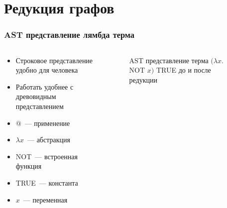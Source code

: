 \section{Редукция графов}

\begin{frame}
    \frametitle{AST представление лямбда терма}
    \begin{columns}
        \begin{column}{0.5\textwidth}
            \begin{itemize}
                \item Строковое представление удобно для человека
                \item Работать удобнее с древовидным представлением
                \item $@$~--- применение
                \item $\lambda x$~--- абстракция
                \item NOT~--- встроенная функция
                \item TRUE~--- константа
                \item $x$~--- переменная
            \end{itemize}
        \end{column}
        \begin{column}{0.5\textwidth}
            \begin{figure}
                \caption{AST представление терма $(\lambda x.$ NOT $x)$ TRUE до и после редукции}
            \end{figure}
        \end{column}
    \end{columns}
\end{frame}

